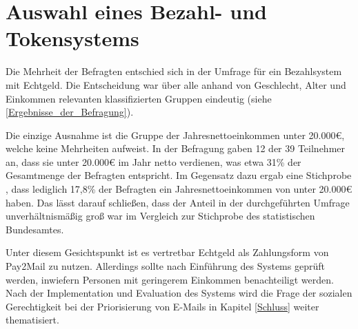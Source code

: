 \section{Auswahl eines Bezahl- und Tokensystems}
\label{Auswahl_eines_Bezahl-_und_Tokensystems}
Die Mehrheit der Befragten entschied sich in der Umfrage für ein Bezahlsystem mit Echtgeld. Die Entscheidung war über alle anhand von Geschlecht, Alter und Einkommen relevanten klassifizierten Gruppen eindeutig (siehe \ref{Ergebnisse_der_Befragung}). 

Die einzige Ausnahme ist die Gruppe der Jahresnettoeinkommen unter 20.000€, welche keine Mehrheiten aufweist. In der Befragung gaben 12 der 39 Teilnehmer an, dass sie unter 20.000€ im Jahr netto verdienen, was etwa 31\% der Gesamtmenge der Befragten entspricht. Im Gegensatz dazu ergab eine Stichprobe \citep[S. 25 f.]{StatistischesBundesamt2018}, dass lediglich 17,8\% der Befragten ein Jahresnettoeinkommen von unter 20.000€ haben. Das lässt darauf schließen, dass der Anteil in der durchgeführten Umfrage unverhältnismäßig groß war im Vergleich zur Stichprobe des statistischen Bundesamtes.

Unter diesem Gesichtspunkt ist es vertretbar Echtgeld als Zahlungsform von Pay2Mail zu nutzen. Allerdings sollte nach Einführung des Systems geprüft werden, inwiefern Personen mit geringerem Einkommen benachteiligt werden. Nach der Implementation und Evaluation des Systems wird die Frage der sozialen Gerechtigkeit bei der Priorisierung von E-Mails in Kapitel \ref{Schluss} weiter thematisiert. 
